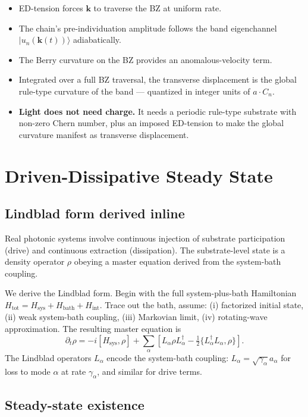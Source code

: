 \documentclass[11pt,a4paper]{article}
\begin{document}
\begin{itemize}[noitemsep]
  \item ED-tension forces $\mathbf{k}$ to traverse the BZ at uniform rate.
  \item The chain's pre-individuation amplitude follows the band eigenchannel $|u_n(\mathbf{k}(t))\rangle$ adiabatically.
  \item The Berry curvature on the BZ provides an anomalous-velocity term.
  \item Integrated over a full BZ traversal, the transverse displacement is the global rule-type curvature of the band --- quantized in integer units of $a\cdot C_n$.
  \item \textbf{Light does not need charge.} It needs a periodic rule-type substrate with non-zero Chern number, plus an imposed ED-tension to make the global curvature manifest as transverse displacement.
\end{itemize}

\section{Driven-Dissipative Steady State}

\subsection{Lindblad form derived inline}

Real photonic systems involve continuous injection of substrate participation (drive) and continuous extraction (dissipation). The substrate-level state is a density operator $\rho$ obeying a master equation derived from the system-bath coupling.

We derive the Lindblad form. Begin with the full system-plus-bath Hamiltonian $H_{\mathrm{tot}} = H_{\mathrm{sys}} + H_{\mathrm{bath}} + H_{\mathrm{int}}$. Trace out the bath, assume: (i) factorized initial state, (ii) weak system-bath coupling, (iii) Markovian limit, (iv) rotating-wave approximation. The resulting master equation is
\[
\partial_t\rho = -i[H_{\mathrm{sys}}, \rho] + \sum_\alpha\left[L_\alpha\rho L_\alpha^\dagger - \tfrac{1}{2}\{L_\alpha^\dagger L_\alpha, \rho\}\right].
\]
The Lindblad operators $L_\alpha$ encode the system-bath coupling: $L_\alpha = \sqrt{\gamma_\alpha}a_\alpha$ for loss to mode $\alpha$ at rate $\gamma_\alpha$, and similar for drive terms.

\subsection{Steady-state existence}
\end{document}
